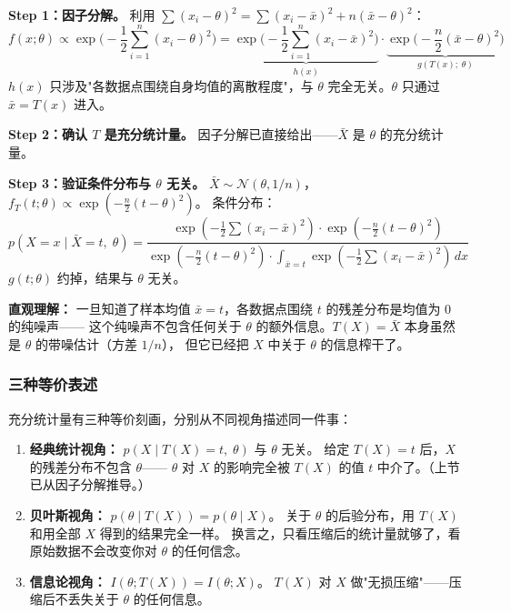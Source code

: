 \documentclass[12pt,a4paper]{ctexart}
\theoremstyle{definition}
\begin{document}
\textbf{Step 1：因子分解。} 利用 $\sum(x_i-\theta)^2 = \sum(x_i-\bar{x})^2 + n(\bar{x}-\theta)^2$：
\[
f(x;\theta)
\propto \exp\!\Big(-\frac{1}{2}\sum_{i=1}^n(x_i-\theta)^2\Big)
= \underbrace{\exp\!\Big(-\frac{1}{2}\sum_{i=1}^n(x_i-\bar{x})^2\Big)}_{h(x)}
\cdot \underbrace{\exp\!\Big(-\frac{n}{2}(\bar{x}-\theta)^2\Big)}_{g(T(x);\;\theta)}
\]
$h(x)$ 只涉及"各数据点围绕自身均值的离散程度"，与 $\theta$ 完全无关。$\theta$ 只通过 $\bar{x}=T(x)$ 进入。

\textbf{Step 2：确认 $T$ 是充分统计量。} 因子分解已直接给出——$\bar{X}$ 是 $\theta$ 的充分统计量。

\textbf{Step 3：验证条件分布与 $\theta$ 无关。}
$\bar{X} \sim \mathcal{N}(\theta, 1/n)$，$f_T(t;\theta) \propto \exp(-\frac{n}{2}(t-\theta)^2)$。
条件分布：
\[
p(X=x \mid \bar{X}=t,\; \theta)
= \frac{\exp(-\frac12\sum(x_i-\bar{x})^2) \cdot \exp(-\frac{n}{2}(t-\theta)^2)}
       {\exp(-\frac{n}{2}(t-\theta)^2) \cdot \int_{\bar{x}=t} \exp(-\frac12\sum(x_i-\bar{x})^2)\,dx}
\]
$g(t;\theta)$ 约掉，结果与 $\theta$ 无关。

\textbf{直观理解：} 一旦知道了样本均值 $\bar{x}=t$，各数据点围绕 $t$ 的残差分布是均值为 0 的纯噪声——
这个纯噪声不包含任何关于 $\theta$ 的额外信息。$T(X)=\bar{X}$ 本身虽然是 $\theta$ 的带噪估计（方差 $1/n$），
但它已经把 $X$ 中关于 $\theta$ 的信息榨干了。

\subsubsection{三种等价表述}

充分统计量有三种等价刻画，分别从不同视角描述同一件事：

\begin{enumerate}[label=\arabic*., leftmargin=*]
  \item \textbf{经典统计视角：}
  $p(X \mid T(X)=t,\; \theta)$ 与 $\theta$ 无关。
  给定 $T(X)=t$ 后，$X$ 的残差分布不包含 $\theta$——
  $\theta$ 对 $X$ 的影响完全被 $T(X)$ 的值 $t$ 中介了。（上节已从因子分解推导。）

  \item \textbf{贝叶斯视角：}
  $p(\theta \mid T(X)) = p(\theta \mid X)$。
  关于 $\theta$ 的后验分布，用 $T(X)$ 和用全部 $X$ 得到的结果完全一样。
  换言之，只看压缩后的统计量就够了，看原始数据不会改变你对 $\theta$ 的任何信念。

  \item \textbf{信息论视角：}
  $I(\theta; T(X)) = I(\theta; X)$。
  $T(X)$ 对 $X$ 做"无损压缩"——压缩后不丢失关于 $\theta$ 的任何信息。
\end{enumerate}
\end{document}
